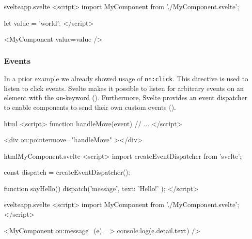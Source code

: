 \begin{listing}[h!]
\begin{myminted}{svelte}{app.svelte}
<script>
  import MyComponent from './MyComponent.svelte';

  let value = 'world';
</script>

<MyComponent value={value} />
\end{myminted}
\caption{Example usage of a custom Svelte component.}
\label{fig:svelte-component-usage}
\end{listing}

\subsubsection{Events}

In a prior example we already showed usage of \texttt{on:click}. This directive is used to listen to click events. Svelte makes it possible to listen for arbitrary events on an element with the \texttt{on}-keyword (). Furthermore, Svelte provides an event dispatcher to enable components to send their own custom events ().

\begin{listing}[h!]
\begin{myminted}[highlightlines={7}]{html}{}
<script>
  function handleMove(event) {
    // ...
  }
</script>

<div on:pointermove="{handleMove}" ></div>
\end{myminted}
\caption{Usage of the \texttt{on:}-directive to listen to \texttt{pointermove} events.}
\label{fig:svelte-on-directive}
\end{listing}


\begin{listing}[h!]
\begin{myminted}{html}{MyComponent.svelte}
<script>
  import { createEventDispatcher } from 'svelte';

  const dispatch = createEventDispatcher();

  function sayHello() {
    dispatch('message', {
      text: 'Hello!'
    });
  }
</script>
\end{myminted}
\begin{myminted}{svelte}{app.svelte}
<script>
  import MyComponent from './MyComponent.svelte';
</script>

<MyComponent on:message={(e) => console.log(e.detail.text)} />
\end{myminted}
\caption{Usage of the event dispatcher to send custom events.}
\label{fig:svelte-custom-event}
\end{listing}

